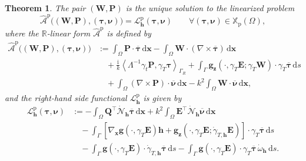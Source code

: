 \documentclass[10pt,a4paper]{amsart}
\newtheorem{theo}{Theorem}[section]
\numberwithin{equation}{section}
\begin{document}
\begin{theo}
The pair $(\mathbf{W}, \mathbf{P})$ is the unique solution to the linearized problem
\[
\widehat{\mathcal{A}}^{\mathrm{p}} \bigl( (\mathbf{W}, \mathbf{P}), (\boldsymbol{\tau}, \boldsymbol{\nu}) \bigr) = \mathcal{L}_{\mathbf{h}}^{\mathrm{p}}(\boldsymbol{\tau}, \boldsymbol{\nu}) \qquad \forall (\boldsymbol{\tau}, \boldsymbol{\nu}) \in \mathbb{X}_{\mathrm{p}}(\Omega),
\]
where the $\mathbb{R}$-linear form $\widehat{\mathcal{A}}^{\mathrm{p}}$ is defined by
\begin{equation*}
\begin{aligned}
\widehat{\mathcal{A}}^{\mathrm{p}} \bigl( (\mathbf{W}, \mathbf{P}), (\boldsymbol{\tau}, \boldsymbol{\nu}) \bigr) &:= \int_{\Omega} \mathbf{P} \cdot \overline{\boldsymbol{\tau}} \,\mathrm{d}\boldsymbol{x} - \int_{\Omega} \mathbf{W} \cdot (\nabla \times \overline{\boldsymbol{\tau}}) \,\mathrm{d}\boldsymbol{x} \\
&\quad + \frac{\mathrm{i}}{k} \left\langle \Lambda^{-1} \gamma_t \mathbf{P}, \gamma_T \boldsymbol{\tau} \right\rangle_{\Gamma_R} + \int_{\Gamma} \mathbf{g}_{\boldsymbol{z}}(\cdot, \gamma_T \mathbf{E}; \gamma_T \mathbf{W}) \cdot \gamma_T \overline{\boldsymbol{\tau}} \,\mathrm{d}s \\
&\quad + \int_{\Omega} (\nabla \times \mathbf{P}) \cdot \overline{\boldsymbol{\nu}} \,\mathrm{d}\boldsymbol{x} - k^2 \int_{\Omega} \mathbf{W} \cdot \overline{\boldsymbol{\nu}} \,\mathrm{d}\boldsymbol{x},
\end{aligned}
\end{equation*}
and the right-hand side functional $\mathcal{L}_{\mathbf{h}}^{\mathrm{p}}$ is given by
\begin{equation*}
\begin{aligned}
\mathcal{L}_{\mathbf{h}}^{\mathrm{p}}(\boldsymbol{\tau}, \boldsymbol{\nu}) &:= -\int_{\Omega} \mathbf{Q}^{\top} \dot{\mathcal{N}}_{\mathbf{h}} \overline{\boldsymbol{\tau}} \,\mathrm{d}\boldsymbol{x} + k^2 \int_{\Omega} \mathbf{E}^{\top} \dot{\mathcal{N}}_{\mathbf{h}} \overline{\boldsymbol{\nu}} \,\mathrm{d}\boldsymbol{x} \\
&\quad - \int_{\Gamma} \left[ \nabla_{\boldsymbol{x}} \mathbf{g}(\cdot, \gamma_T \mathbf{E}) \mathbf{h} + \mathbf{g}_{\boldsymbol{z}}(\cdot, \gamma_T \mathbf{E}; \dot{\gamma}_{T,\mathbf{h}} \mathbf{E}) \right] \cdot \gamma_T \overline{\boldsymbol{\tau}} \,\mathrm{d}s \\
&\quad - \int_{\Gamma} \mathbf{g}(\cdot, \gamma_T \mathbf{E}) \cdot \dot{\gamma}_{T,\mathbf{h}} \overline{\boldsymbol{\tau}} \,\mathrm{d}s - \int_{\Gamma} \mathbf{g}(\cdot, \gamma_T \mathbf{E}) \cdot \gamma_T \overline{\boldsymbol{\tau}} \, \dot{\omega}_{\mathbf{h}} \,\mathrm{d}s.
\end{aligned}
\end{equation*}
\end{theo}
\end{document}
